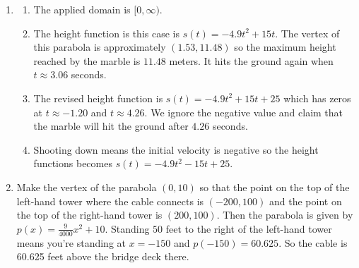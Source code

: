 \documentclass{ximera}
\begin{document}
\begin{enumerate}
\setcounter{enumi}{\value{HW}}


\item \begin{enumerate}

\item The applied domain is $[0, \infty)$.

\addtocounter{enumii}{2}

\item The height function is this case is $s(t) = -4.9t^{2} + 15t$.  The vertex of this parabola is approximately $(1.53, 11.48)$ so the maximum height reached by the marble is $11.48$ meters.  It hits the ground again when $t \approx 3.06$ seconds.

\item The revised height function is $s(t) = -4.9t^{2} + 15t + 25$ which has zeros at $t \approx -1.20$ and $t \approx 4.26$.  We ignore the negative value and claim that the marble will hit the ground after $4.26$ seconds.

\item Shooting down means the initial velocity is negative so the height functions becomes $s(t) = -4.9t^{2} - 15t + 25$.

\end{enumerate}

\item Make the vertex of the parabola $(0, 10)$ so that the point on the top of the left-hand tower where the cable connects is $(-200, 100)$ and the point on the top of the right-hand tower is $(200, 100)$.  Then the parabola is given by $p(x) = \frac{9}{4000}x^{2} + 10$.  Standing $50$ feet to the right of the left-hand tower means you're standing at $x= -150$ and $p(-150) = 60.625$.  So the cable is 60.625 feet above the bridge deck there.



\setcounter{HW}{\value{enumi}}
\end{enumerate}
\end{document}

